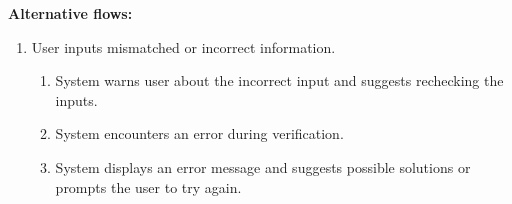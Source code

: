 \documentclass[]{final_report}
\theoremstyle{definition}
\begin{document}
\noindent\textbf{Alternative flows:}
\begin{enumerate}
    \item User inputs mismatched or incorrect information.
    \begin{enumerate}
        \item System warns user about the incorrect input and suggests rechecking the inputs.
        \item System encounters an error during verification.
        \item System displays an error message and suggests possible solutions or prompts the user to try again.
    \end{enumerate}
\end{enumerate}




\newpage

\printbibliography
\label{endpage}
\end{document}
